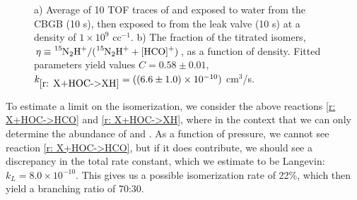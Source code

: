 \begin{figure}[H]
	\centering
	\caption{a) Average of 10 TOF traces of  and  exposed to water from the CBGB (10 s), then exposed to  from the leak valve (10 s) at a density of $1 \times 10^9$ cc$^{-1}$. b) The fraction of the titrated isomers, $\eta \equiv \ce{^{15}N2H+}/(\ce{^{15}N2H+}+\ce{[HCO]+})$, as a function of  density. Fitted parameters yield values $C = 0.58 \pm 0.01$, $k_{\ref{r: X+HOC->XH}} = ((6.6 \pm 1.0) \times 10^{-10})$ cm$^3$/s.}
	\label{fig: N2 pressure scan}
\end{figure}

To estimate a limit on the isomerization, we consider the above reactions \ref{r: X+HOC->HCO} and \ref{r: X+HOC->XH}, where  in the context that we can only determine the abundance of \ce{[HCO]+} and . As a function of pressure, we cannot see reaction \ref{r: X+HOC->HCO}, but if it does contribute, we should see a discrepancy in the total rate constant, which we estimate to be Langevin: $k_L = 8.0 \times 10^{-10}$. This gives us a possible isomerization rate of 22\%, which then yield a branching ratio of 70:30.
%

